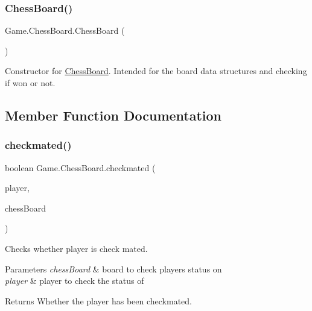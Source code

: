 \subsubsection{\texorpdfstring{Chess\+Board()}{ChessBoard()}}
{\footnotesize\ttfamily Game.\+Chess\+Board.\+Chess\+Board (\begin{DoxyParamCaption}{ }\end{DoxyParamCaption})\hspace{0.3cm}{\ttfamily [inline]}}

Constructor for \hyperlink{class_game_1_1_chess_board}{Chess\+Board}. Intended for the board data structures and checking if won or not. 

\subsection{Member Function Documentation}
\mbox{\label{class_game_1_1_chess_board_a79832c1dee410398129a1d2365819836}} 
\subsubsection{\texorpdfstring{checkmated()}{checkmated()}}
{\footnotesize\ttfamily boolean Game.\+Chess\+Board.\+checkmated (\begin{DoxyParamCaption}\item[{\hyperlink{class_game_1_1_player}{Player}}]{player,  }\item[{\hyperlink{class_game_1_1_chess_board}{Chess\+Board}}]{chess\+Board }\end{DoxyParamCaption})\hspace{0.3cm}{\ttfamily [inline]}}

Checks whether player is check mated. 
\begin{DoxyParams}{Parameters}
{\em chess\+Board} & board to check players status on \\
\hline
{\em player} & player to check the status of \\
\hline
\end{DoxyParams}
\begin{DoxyReturn}{Returns}
Whether the player has been checkmated. 
\end{DoxyReturn}
\mbox{\label{class_game_1_1_chess_board_a021ffe2d9253de4c5a59e58c6dd52730}} 
